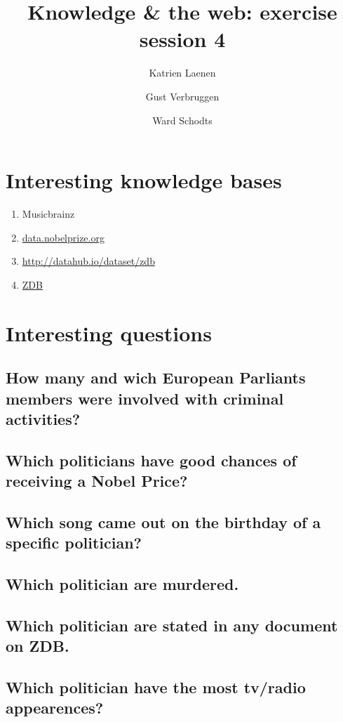 \documentclass[11pt,a4paper]{article}
\author{
  Katrien Laenen\\
  \and
  Gust Verbruggen\\
  \and
  Ward Schodts
}
\title{Knowledge \& the web: exercise session 4}
\begin{document}
\maketitle
\section{Interesting knowledge bases}
\begin{enumerate}

\item Musicbrainz
\item \url{data.nobelprize.org}
\item \url{http://datahub.io/dataset/zdb}
\item \url{ZDB}


\end{enumerate}
\section{Interesting questions}
\subsection{How many and wich European Parliants members were involved with criminal activities?}
\subsection{Which politicians have good chances of receiving a Nobel Price?}
\subsection{Which song came out on the birthday of a specific politician?}
\subsection{Which politician are murdered.}
\subsection{Which politician are stated in any document on ZDB.}
\subsection{Which politician have the most tv/radio appearences?}
\end{document}
